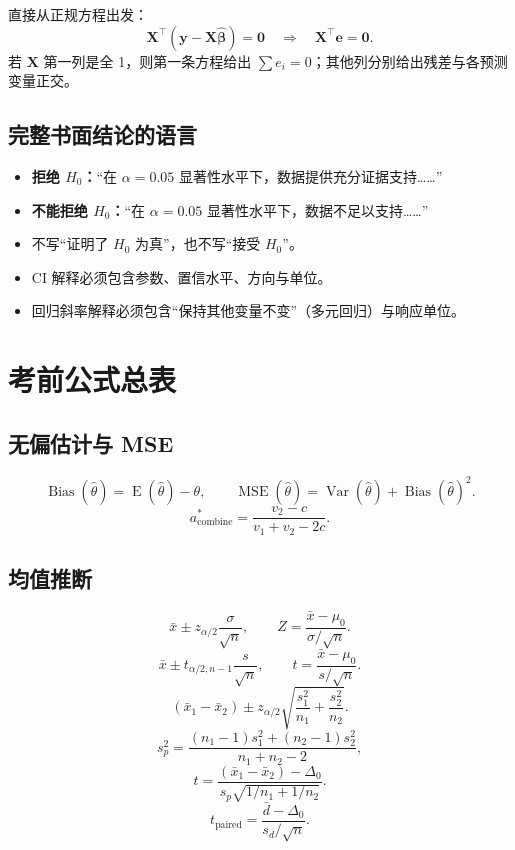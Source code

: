 \documentclass[11pt,a4paper]{article}
\newcommand{\E}{\operatorname{E}}
\newcommand{\Var}{\operatorname{Var}}
\newcommand{\Bias}{\operatorname{Bias}}
\newcommand{\MSE}{\operatorname{MSE}}
\newcommand{\1}{\mathbf{1}}
\newcommand{\by}{\mathbf{y}}
\newcommand{\bX}{\mathbf{X}}
\newcommand{\be}{\mathbf{e}}
\newcommand{\bbeta}{\boldsymbol{\beta}}
\begin{document}
\begin{methodbox}
直接从正规方程出发：
\[
  \bX^\top(\by-\bX\hat{\bbeta})=\mathbf0
  \quad\Longrightarrow\quad
  \bX^\top\be=\mathbf0.
\]
若 $\bX$ 第一列是全 1，则第一条方程给出 $\sum e_i=0$；其他列分别给出残差与各预测变量正交。
\end{methodbox}

\subsection{完整书面结论的语言}

\begin{itemize}
  \item \textbf{拒绝 $H_0$：}“在 $\alpha=0.05$ 显著性水平下，数据提供充分证据支持……”
  \item \textbf{不能拒绝 $H_0$：}“在 $\alpha=0.05$ 显著性水平下，数据不足以支持……” 
  \item 不写“证明了 $H_0$ 为真”，也不写“接受 $H_0$”。
  \item CI 解释必须包含参数、置信水平、方向与单位。
  \item 回归斜率解释必须包含“保持其他变量不变”（多元回归）与响应单位。
\end{itemize}

\section{考前公式总表}

\subsection{无偏估计与 MSE}

\[
  \Bias(\hat\theta)=\E(\hat\theta)-\theta,
  \qquad
  \MSE(\hat\theta)=\Var(\hat\theta)+\Bias(\hat\theta)^2.
\]
\[
  a^*_{\text{combine}}
  =
  \frac{v_2-c}{v_1+v_2-2c}.
\]

\subsection{均值推断}

\[
  \bar x\pm z_{\alpha/2}\frac{\sigma}{\sqrt n},
  \qquad
  Z=\frac{\bar x-\mu_0}{\sigma/\sqrt n}.
\]
\[
  \bar x\pm t_{\alpha/2,n-1}\frac{s}{\sqrt n},
  \qquad
  t=\frac{\bar x-\mu_0}{s/\sqrt n}.
\]
\[
  (\bar x_1-\bar x_2)
  \pm
  z_{\alpha/2}
  \sqrt{\frac{s_1^2}{n_1}+\frac{s_2^2}{n_2}}.
\]
\[
  s_p^2
  =
  \frac{(n_1-1)s_1^2+(n_2-1)s_2^2}{n_1+n_2-2},
\]
\[
  t
  =
  \frac{(\bar x_1-\bar x_2)-\Delta_0}
  {s_p\sqrt{1/n_1+1/n_2}}.
\]
\[
  t_{\mathrm{paired}}
  =
  \frac{\bar d-\Delta_0}{s_d/\sqrt n}.
\]
\end{document}
